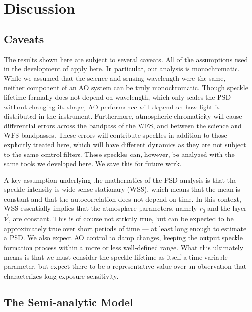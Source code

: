 \documentclass[10pt,preprint]{aastex631}
\begin{document}
\section{Discussion}
\label{sec:discussion}

\subsection{Caveats}

The results shown here are subject to several caveats.  All of the assumptions used in the development of \citet{2018JATIS...4a9001M} apply here.  In particular, our analysis is monochromatic. While we assumed that the science and sensing wavelength were the same, neither component of an AO system can be truly monochromatic.  Though speckle lifetime formally does not depend on wavelength, which only scales the PSD without changing its shape, AO performance will depend on how light is distributed in the instrument.  Furthermore, atmospheric chromaticity will cause differential errors across the bandpass of the WFS, and between the science and WFS bandpasses.  These errors will contribute speckles in addition to those explicitly treated here, which will have different dynamics as they are not subject to the same control filters.  These speckles can, however, be analyzed with the same tools we developed here.  We save this for future work.

A key assumption underlying the mathematics of the PSD analysis is that the speckle intensity is wide-sense stationary (WSS), which means that the mean is constant and that the autocorrelation does not depend on time.  In this context, WSS essentially implies that the atmosphere parameters, namely $r_0$ and the layer $\vec{\mathcal{V}}$, are constant.  This is of course not strictly true, but can be expected to be approximately true over short periods of time --- at least long enough to estimate a PSD.  We also expect AO control to damp changes, keeping the output speckle formation process within a more or less well-defined range.  What this ultimately means is that we must consider the speckle lifetime as itself a time-variable parameter, but expect there to be a representative value over an observation that characterizes long exposure sensitivity.

\subsection{The Semi-analytic Model}
\end{document}
